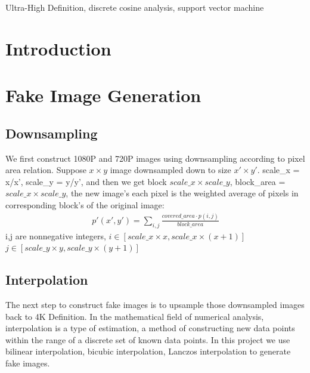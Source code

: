 \documentclass[journal,conference]{IEEEtran}
\begin{document}
\begin{IEEEkeywords}
Ultra-High Definition, discrete cosine analysis, support vector machine
\end{IEEEkeywords}


\IEEEpeerreviewmaketitle



\section{Introduction}

\section{Fake Image Generation}

\subsection{Downsampling}
We first construct 1080P and 720P images using downsampling according to pixel area relation. Suppose $x\times y$ image downsampled down to size $x'\times y'$. scale\_x = x/x', scale\_y = y/y', and then we get block $scale\_x \times scale\_y$, block\_area = $scale\_x \times scale\_y$, the new image's each pixel is the weighted average of pixels in corresponding block's of the original image: 
\begin{align*}
	p'(x',y')=\sum_{i,j}{\frac{covered\_area \cdot p(i,j)}{block\_area}}
\end{align*}
i,j are nonnegative integers, $i \in [scale\_x\times x,scale\_x\times (x+1)]$ $j \in [scale\_y\times y,scale\_y\times (y+1)]$

\subsection{Interpolation}
The next step to construct fake images is to upsample those downsampled images back to 4K Definition.
In the mathematical field of numerical analysis, interpolation is a type of estimation, a method of constructing new data points within the range of a discrete set of known data points.
In this project we use bilinear interpolation, bicubic interpolation, Lanczos interpolation to generate fake images.
\end{document}

